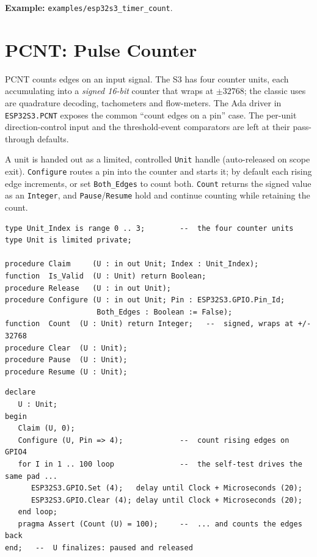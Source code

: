 \noindent\textbf{Example:} \texttt{examples/esp32s3\_timer\_count}.

\section{PCNT: Pulse Counter}
\label{app:int:pcnt}

PCNT counts edges on an input signal. The S3 has four counter units, each
accumulating into a \emph{signed 16-bit} counter that wraps at $\pm 32768$; the
classic uses are quadrature decoding, tachometers and flow-meters. The Ada driver
in \texttt{ESP32S3.PCNT} exposes the common ``count edges on a pin'' case. The
per-unit direction-control input and the threshold-event comparators are left at
their pass-through defaults.

A unit is handed out as a limited, controlled \texttt{Unit} handle (auto-released
on scope exit). \texttt{Configure} routes a pin into the counter and starts it; by
default each rising edge increments, or set \texttt{Both\_Edges} to count both.
\texttt{Count} returns the signed value as an \texttt{Integer}, and
\texttt{Pause}/\texttt{Resume} hold and continue counting while retaining the
count.

\begin{lstlisting}
type Unit_Index is range 0 .. 3;        --  the four counter units
type Unit is limited private;

procedure Claim     (U : in out Unit; Index : Unit_Index);
function  Is_Valid  (U : Unit) return Boolean;
procedure Release   (U : in out Unit);
procedure Configure (U : in out Unit; Pin : ESP32S3.GPIO.Pin_Id;
                     Both_Edges : Boolean := False);
function  Count  (U : Unit) return Integer;   --  signed, wraps at +/- 32768
procedure Clear  (U : Unit);
procedure Pause  (U : Unit);
procedure Resume (U : Unit);
\end{lstlisting}

\begin{lstlisting}
declare
   U : Unit;
begin
   Claim (U, 0);
   Configure (U, Pin => 4);             --  count rising edges on GPIO4
   for I in 1 .. 100 loop               --  the self-test drives the same pad ...
      ESP32S3.GPIO.Set (4);   delay until Clock + Microseconds (20);
      ESP32S3.GPIO.Clear (4); delay until Clock + Microseconds (20);
   end loop;
   pragma Assert (Count (U) = 100);     --  ... and counts the edges back
end;   --  U finalizes: paused and released
\end{lstlisting}

